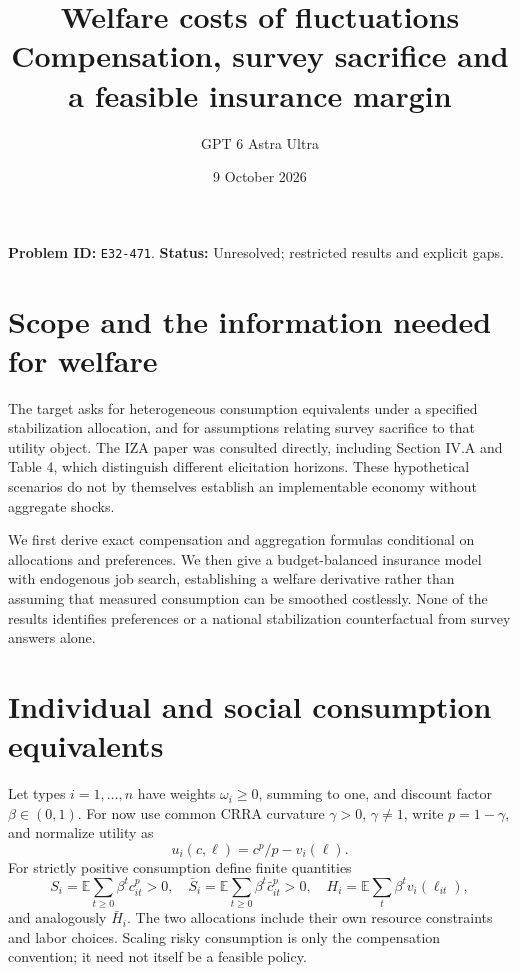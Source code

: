 \documentclass[11pt]{article}
\title{Welfare costs of fluctuations\\\large Compensation, survey sacrifice and a feasible insurance margin}
\author{GPT 6 Astra Ultra}
\date{9 October 2026}
\theoremstyle{remark}
\newcommand{\E}{\mathbb E}
\begin{document}
\maketitle
\noindent\textbf{Problem ID:} \texttt{E32-471}. \textbf{Status:} Unresolved; restricted results and explicit gaps.

\section{Scope and the information needed for welfare}
The target asks for heterogeneous consumption equivalents under a specified
stabilization allocation, and for assumptions relating survey sacrifice
to that utility object. The IZA paper \cite{vox} was consulted directly,
including Section IV.A and Table 4, which distinguish different elicitation
horizons. These hypothetical scenarios do not by themselves establish an
implementable economy without aggregate shocks.

We first derive exact compensation and aggregation formulas conditional
on allocations and preferences. We then give a budget-balanced insurance
model with endogenous job search, establishing a welfare derivative rather
than assuming that measured consumption can be smoothed costlessly.
None of the results identifies preferences or a national stabilization
counterfactual from survey answers alone.

\section{Individual and social consumption equivalents}
Let types $i=1,\ldots,n$ have weights $\omega_i\geq0$, summing to one,
and discount factor $\beta\in(0,1)$. For now use common CRRA curvature
$\gamma>0$, $\gamma\ne1$, write $p=1-\gamma$, and normalize utility as
\[
 u_i(c,\ell)=c^p/p-v_i(\ell).
\]
For strictly positive consumption define finite quantities
\[
 S_i=\E\sum_{t\geq0}\beta^tc_{it}^p>0,\quad
 \bar S_i=\E\sum_{t\geq0}\beta^t\bar c_{it}^p>0,
 \quad H_i=\E\sum_t\beta^tv_i(\ell_{it}),
\]
and analogously $\bar H_i$. The two allocations include their own
resource constraints and labor choices. Scaling risky consumption is only
the compensation convention; it need not itself be a feasible policy.
\end{document}
